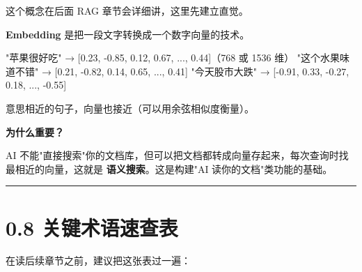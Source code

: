 这个概念在后面 RAG 章节会详细讲，这里先建立直觉。


\textbf{Embedding} 是把一段文字转换成一个数字向量的技术。


\begin{codeblock}
"苹果很好吃" → [0.23, -0.85, 0.12, 0.67, ..., 0.44]（768 或 1536 维）
"这个水果味道不错" → [0.21, -0.82, 0.14, 0.65, ..., 0.41]
"今天股市大跌" → [-0.91, 0.33, -0.27, 0.18, ..., -0.55]
\end{codeblock}

意思相近的句子，向量也接近（可以用余弦相似度衡量）。


\textbf{为什么重要？}


AI 不能"直接搜索"你的文档库，但可以把文档都转成向量存起来，每次查询时找最相近的向量，这就是 \textbf{语义搜索}。这是构建"AI 读你的文档"类功能的基础。


\bigskip\hrule\bigskip

\section{0.8 关键术语速查表}

在读后续章节之前，建议把这张表过一遍：


